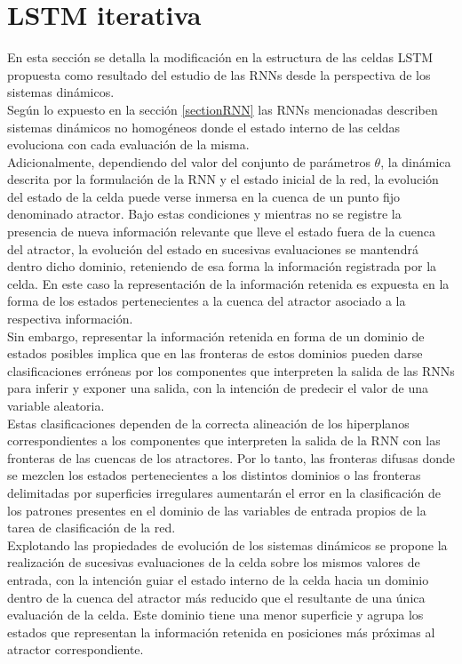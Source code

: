 \documentclass{article}
\begin{document}
	\section{LSTM iterativa}\label{sectionIterativeLSTM}
	En esta sección se detalla la modificación en la estructura de las celdas LSTM propuesta como resultado del estudio de las RNNs desde la perspectiva de los sistemas dinámicos.\\
	Según lo expuesto en la sección \ref{sectionRNN} las RNNs mencionadas describen sistemas dinámicos no homogéneos donde el estado interno de las celdas evoluciona con cada evaluación de la misma.\\
	Adicionalmente, dependiendo del valor del conjunto de parámetros $\theta$, la dinámica descrita por la formulación de la RNN y el estado inicial de la red, la evolución del estado de la celda puede verse inmersa en la cuenca de un punto fijo denominado atractor. Bajo estas condiciones y mientras no se registre la presencia de nueva información relevante que lleve el estado fuera de la cuenca del atractor, la evolución del estado en sucesivas evaluaciones se mantendrá dentro dicho dominio, reteniendo de esa forma la información registrada por la celda. En este caso la representación de la información retenida es expuesta en la forma de los estados pertenecientes a la cuenca del atractor asociado a la respectiva información.\\
	Sin embargo, representar la información retenida en forma de un dominio de estados posibles implica que en las fronteras de estos dominios pueden darse clasificaciones erróneas por los componentes que interpreten la salida de las RNNs para inferir y exponer una salida, con la intención de predecir el valor de una variable aleatoria.\\
	Estas clasificaciones dependen de la correcta alineación de los hiperplanos correspondientes a los componentes que interpreten la salida de la RNN con las fronteras de las cuencas de los atractores. Por lo tanto, las fronteras difusas	donde se mezclen los estados pertenecientes a los distintos dominios o las fronteras delimitadas por superficies irregulares aumentarán el error en la clasificación de los patrones presentes en el dominio de las variables de entrada propios de la tarea de clasificación de la red.\\
	Explotando las propiedades de evolución de los sistemas dinámicos se propone la realización de sucesivas evaluaciones de la celda sobre los mismos valores de entrada, con la intención guiar el estado interno de la celda hacia un dominio dentro de la cuenca del atractor más reducido que el resultante de una única evaluación de la celda. Este dominio tiene una menor superficie y agrupa los estados que representan la información retenida en posiciones más próximas al atractor correspondiente.\\
\end{document}
